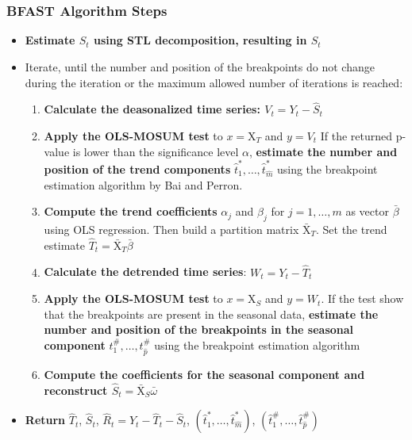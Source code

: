 \documentclass[presentation.tex]{subfiles}
\begin{document}
\begin{frame}
  \frametitle{BFAST Algorithm Steps}
  \begin{itemize}
  \item \textbf{Estimate $S_t$ using STL decomposition, resulting in $\hat{S}_t$}
  \item Iterate, until the number and position of the breakpoints do
    not change during the iteration or the maximum allowed number of iterations
    is reached:
    \begin{enumerate}
    \item \textbf{Calculate the deasonalized time series: $V_t = Y_t - \hat{S}_t$}
    \item \textbf{Apply the OLS-MOSUM test} to $x = \mathrm{X}_T$ and $y = V_t$
      If the returned p-value is lower than the significance level $\alpha$,
      \textbf{estimate the number and position of the trend components}
      $\hat{t}_1^*,\hdots, \hat{t}_{\hat{m}}^*$
      using the breakpoint estimation algorithm by Bai and Perron.
    \item \textbf{Compute the trend coefficients} $\alpha_j$ and $\beta_j$
       for $j = 1, \hdots, m$ as vector $\bar{\beta}$ using OLS regression. Then build
       a partition matrix $\bar{\mathrm{X}}_T$. Set the trend estimate
       $\hat{T}_t = \bar{\mathrm{X}}_T \bar{\beta}$
    \item \textbf{Calculate the detrended time series}: $W_t = Y_t - \hat{T}_t$
    \item \textbf{Apply the OLS-MOSUM test} to $x = \mathrm{X}_S$ and $y = W_t$.
    If the test show that the breakpoints are present in the
      seasonal data, \textbf{estimate the number and position of the
      breakpoints in the seasonal component} $t_1^{\#},\hdots, t_{\hat{p}}^{\#}$ using
      the breakpoint estimation algorithm 
    \item \textbf{Compute the coefficients for the seasonal component
      and reconstruct $\hat{S}_t = \bar{\mathrm{X}}_S \bar{\omega}$}
  \end{enumerate}
\item \textbf{Return} $\hat{T}_t$, $\hat{S}_t$, $\hat{R}_t = Y_t - \hat{T}_t -\hat{S}_t$,
  $(\hat{t}_1^*, \hdots, \hat{t}_{\hat{m}}^*)$, $(\hat{t}_1^{\#}, \hdots, \hat{t}_{\hat{p}}^{\#})$
\end{itemize}
\end{frame}
\end{document}
